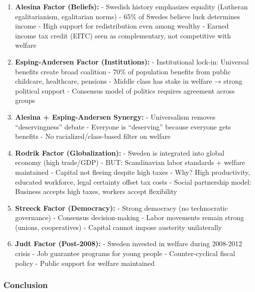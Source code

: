 \begin{enumerate}

\item \textbf{Alesina Factor (Beliefs):}
   - Swedish history emphasizes equality (Lutheran egalitarianism, egalitarian norms)
   - 65\% of Swedes believe luck determines income
   - High support for redistribution even among wealthy
   - Earned income tax credit (EITC) seen as complementary, not competitive with welfare

\item \textbf{Esping-Andersen Factor (Institutions):}
   - Institutional lock-in: Universal benefits create broad coalition
   - 70\% of population benefits from public childcare, healthcare, pensions
   - Middle class has stake in welfare → strong political support
   - Consensus model of politics requires agreement across groups

\item \textbf{Alesina + Esping-Andersen Synergy:}
   - Universalism removes ``deservingness'' debate
   - Everyone is ``deserving'' because everyone gets benefits
   - No racialized/class-based filter on welfare

\item \textbf{Rodrik Factor (Globalization):}
   - Sweden is integrated into global economy (high trade/GDP)
   - BUT: Scandinavian labor standards + welfare maintained
   - Capital not fleeing despite high taxes
   - Why? High productivity, educated workforce, legal certainty offset tax costs
   - Social partnership model: Business accepts high taxes, workers accept flexibility

\item \textbf{Streeck Factor (Democracy):}
   - Strong democracy (no technocratic governance)
   - Consensus decision-making
   - Labor movements remain strong (unions, cooperatives)
   - Capital cannot impose austerity unilaterally

\item \textbf{Judt Factor (Post-2008):}
   - Sweden invested in welfare during 2008-2012 crisis
   - Job guarantee programs for young people
   - Counter-cyclical fiscal policy
   - Public support for welfare maintained

\end{enumerate}

\subsubsection{Conclusion}

